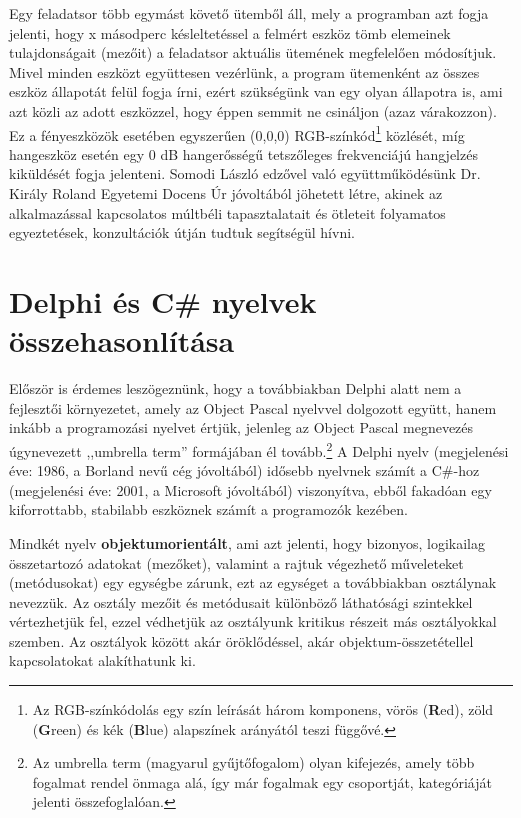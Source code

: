 \documentclass[tocnopagenum]{thesis-ekf}
\begin{document}
	Egy feladatsor több egymást követő ütemből áll, mely a programban azt fogja jelenti, hogy x másodperc késleltetéssel a felmért eszköz tömb elemeinek tulajdonságait (mezőit) a feladatsor aktuális ütemének megfelelően módosítjuk. Mivel minden eszközt együttesen vezérlünk, a program ütemenként az összes eszköz állapotát felül fogja írni, ezért szükségünk van egy olyan állapotra is, ami azt közli az adott eszközzel, hogy éppen semmit ne csináljon (azaz várakozzon). Ez a fényeszközök esetében egyszerűen (0,0,0) RGB-színkód\footnote{Az RGB-színkódolás egy szín leírását három komponens, vörös (\textbf{R}ed), zöld (\textbf{G}reen) és kék (\textbf{B}lue) alapszínek arányától teszi függővé.} közlését, míg hangeszköz esetén egy 0 dB hangerősségű tetszőleges frekvenciájú hangjelzés kiküldését fogja jelenteni.
	Somodi László edzővel való együttműködésünk Dr. Király Roland Egyetemi Docens Úr jóvoltából jöhetett létre, akinek az alkalmazással kapcsolatos múltbéli tapasztalatait és  ötleteit folyamatos egyeztetések, konzultációk útján tudtuk segítségül hívni.
	\section{Delphi és C\# nyelvek összehasonlítása}
	Először is érdemes leszögeznünk, hogy a továbbiakban Delphi alatt nem a fejlesztői környezetet, amely az Object Pascal nyelvvel dolgozott együtt, hanem inkább a programozási nyelvet értjük, jelenleg az Object Pascal megnevezés úgynevezett ,,umbrella term'' formájában él tovább.\footnote{Az umbrella term (magyarul gyűjtőfogalom) olyan kifejezés, amely több fogalmat rendel önmaga alá, így már fogalmak egy csoportját, kategóriáját jelenti összefoglalóan.} \cite{sof_delphi}
	A Delphi nyelv (megjelenési éve: 1986, a Borland nevű cég jóvoltából) idősebb nyelvnek számít a C\#-hoz (megjelenési éve: 2001, a Microsoft 
	jóvoltából) viszonyítva, ebből fakadóan egy kiforrottabb, stabilabb eszköznek számít a programozók kezében. 
	
	Mindkét nyelv \textbf{objektumorientált}, ami azt jelenti, hogy bizonyos, logikailag összetartozó adatokat (mezőket), valamint a rajtuk végezhető műveleteket (metódusokat) egy egységbe zárunk, ezt az egységet a továbbiakban osztálynak nevezzük. Az osztály mezőit és metódusait különböző láthatósági szintekkel vértezhetjük fel, ezzel védhetjük az osztályunk kritikus részeit más osztályokkal szemben. Az osztályok között akár öröklődéssel, akár objektum-összetétellel kapcsolatokat alakíthatunk ki.
	
\end{document}

